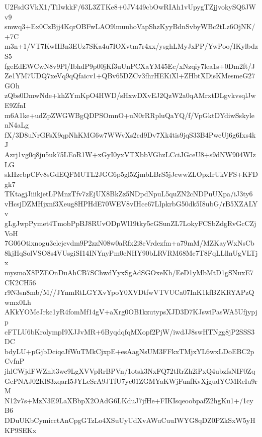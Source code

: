 U2FsdGVkX1/TiIwkkF/63L3ZTKe8+0JV449cbOwRIAh1vUpygTZjjvokySQ6JWv9
smwq3+Ex0CzBjj4KqrOBFwLAO9lmuuhoVapShzKyyBdnSvbyWBc2tLz6OjNK/+7C
m3n+1/VT7KwHBn3EUz7SKa4u7IOXvtm7r4xx/ysghLMyJxPP/YwPoo/IKylbdzS5
fgeEdEWCwN8v9Pl/IbhdP9p00jKf3uUnPCXaYM45Ec/xNzqiy7lea1s+0Dm2ft/J
Ze1YM7UDQ7xeVq9qQfaicv1+QBv65DZCv3fhrHEKiXl+ZHbtXDisKMesmeG27GOh
zQbs0DmwNde+khZYmKpO4HWD/sHxwDXvEJ2QzW2a0qAMrxtDLgvkvsqlJwE9ZfnI
m6A1ke+udZpZWGWBgQDPSOmnO+uN0rRRpluQaYQ/f/VpGktDYdiwSskylenN4aLg
fX/3D8uNrGFsX9qpNhKMG6w7WWvXs2cd9Dv7Xk4tis9jqS33B4PweUj6g6Ixs4kJ
Azrj1vg0q8ju5uk75LEoR1W+xGyI0yxVTXbbVGhzLCciJGceU8+s9dNW904WIzLG
skHzcbpCFv8sGdEQFMUTL2JGG6p5gl5ZjmbLBrS5jJcwwZLOpxIrUkVFS+KFDgk7
TKtagjJiiikjetLPMnzTfv7zEjUX8BkZz5NDpdNpuL5quZN2cNDPuUXpa/iJ3ty6
vHcsjDZMHjxnf3Xeug8HPHdE70WEV8vIHce67LIpkrbG50dk5I8ubG/rB5XZALYv
gLgJwpPymet4TmobPpBJ8RUvODpWl19tky5cGSunZL7LokyFCSbZdgRvGcCZjVoH
7G06Otixnogu3clcjcvdm9P2zzN08w0aRfx2i8cVrdezfm+a79mM/MZKayWxNsCb
8kjHqSolVSO8s4VUsgiSI14INYnyPm0eNHY90bLRVRM68Mc7T8FqLLllnUgVLTjx
mysmoX8PZEOnDuAhCB7SChwdYyxSgAdSGOxeKh/EeD1yMbMtD1gSNuxE7CK2CH56
r9N3sn8mb/M//JYnmRtLGYXvYpoY0XVDtfwVTVUCa07InK1kfBZKRYAPzQwmx0Lh
AKkYOMeJrkc1yR4fomMf14gV+aXrg0OB1kzutypsXJD3D7KJswiPasWA5Ufjypjp
cFTLU6bKrolympI9XJJvMR+6ByqdqfqMXopf2PjW/iwdJJ8swHTNgg8jP2SSS3DC
bdyLU+pGjbDciqcJfWuTMkCjxpE+esAagNsUM3FFkxTMjxYL6wxLDoEBC2pCvfnP
jhlCWjdFWZnlt3wc9LgXVVpRrBPVn/1otsk3NxFQ72tRrZh2iPxQ4ubzfsNIF0Zq
GePNAJ02Kl83xqarI5JYLcSrA9JTfU7yc01ZGMYaKWjFunfKvXjgudYCMRcIu9rM
N12v7s+MzN3E9LaXBbpX2OAdG6LKduJ7jfHe+FIKIsqeoobpafZ2hgKu1+/1cyB6
DDuUKbCymicctAnCpgGTzLo4XSuUyUdXvAWuCuuIWYG8qDZ0PZkSxW5yHKP9SEKx
